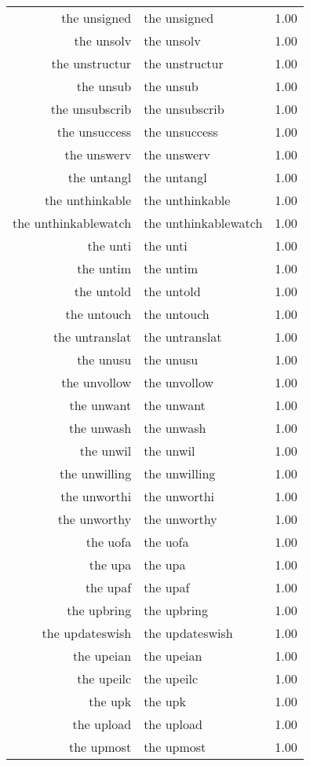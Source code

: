 \begin{table}[ht]
\begin{tabular}{rlr}
  the unsigned & the unsigned & 1.00 \\ 
  the unsolv & the unsolv & 1.00 \\ 
  the unstructur & the unstructur & 1.00 \\ 
  the unsub & the unsub & 1.00 \\ 
  the unsubscrib & the unsubscrib & 1.00 \\ 
  the unsuccess & the unsuccess & 1.00 \\ 
  the unswerv & the unswerv & 1.00 \\ 
  the untangl & the untangl & 1.00 \\ 
  the unthinkable & the unthinkable & 1.00 \\ 
  the unthinkablewatch & the unthinkablewatch & 1.00 \\ 
  the unti & the unti & 1.00 \\ 
  the untim & the untim & 1.00 \\ 
  the untold & the untold & 1.00 \\ 
  the untouch & the untouch & 1.00 \\ 
  the untranslat & the untranslat & 1.00 \\ 
  the unusu & the unusu & 1.00 \\ 
  the unvollow & the unvollow & 1.00 \\ 
  the unwant & the unwant & 1.00 \\ 
  the unwash & the unwash & 1.00 \\ 
  the unwil & the unwil & 1.00 \\ 
  the unwilling & the unwilling & 1.00 \\ 
  the unworthi & the unworthi & 1.00 \\ 
  the unworthy & the unworthy & 1.00 \\ 
  the uofa & the uofa & 1.00 \\ 
  the upa & the upa & 1.00 \\ 
  the upaf & the upaf & 1.00 \\ 
  the upbring & the upbring & 1.00 \\ 
  the updateswish & the updateswish & 1.00 \\ 
  the upeian & the upeian & 1.00 \\ 
  the upeilc & the upeilc & 1.00 \\ 
  the upk & the upk & 1.00 \\ 
  the upload & the upload & 1.00 \\ 
  the upmost & the upmost & 1.00 \\ 

\end{tabular}
\end{table}
